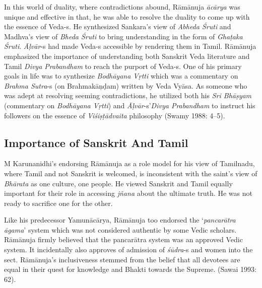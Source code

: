 In this world of duality, where contradictions abound, Rāmānuja \textit{ācārya} was unique and effective in that, he was able to resolve the duality to come up with the essence of Veda-s. He synthesized Sankara’s view of \textit{Abheda Śruti} and Madhva’s view of \textit{Bheda Śruti} to bring understanding in the form of \textit{Ghaṭaka Śruti}. \textit{Āḷvār}-s had made Veda-s accessible by rendering them in Tamil. Rāmānuja emphasized the importance of understanding both Sanskrit Veda literature and Tamil \textit{Divya Prabandham} to reach the purport of Veda-s. One of his primary goals in life was to synthesize \textit{Bodhāyana Vṛtti} which was a commentary on \textit{Brahma Sutra}-s (on Brahmakāņḍam) written by Veda Vyāsa. As someone who was adept at resolving seeming contradictions, he utilized both his \textit{Sri Bhāṣyam} (commentary on \textit{Bodhāyana Vṛtti}) and \textit{Āḷvār}-s’\textit{Divya Prabandham} to instruct his followers on the essence of \textit{Viśiṣṭādvaita} philosophy (Swamy 1988: 4–5).

\vskip -20pt


\subsection*{Importance of Sanskrit And Tamil}

\vskip -6pt

M Karunanidhi’s endorsing Rāmānuja as a role model for his view of Tamilnadu, where Tamil and not Sanskrit is welcomed, is inconsistent with the saint’s view of \textit{Bhārata} as one culture, one people. He viewed Sanskrit and Tamil equally important for their role in accessing \textit{jñana} about the ultimate truth. He was not ready to sacrifice one for the other.

Like his predecessor Yamunācārya, Rāmānuja too endorsed the ‘\textit{pancarātra āgama}’ system which was not considered authentic by some Vedic scholars. Rāmānuja firmly believed that the pancarātra system was an approved Vedic system. It incidentally also approves of admission of \textit{śūdra}-s and women into the sect. Rāmānuja’s inclusiveness stemmed from the belief that all devotees are equal in their quest for knowledge and Bhakti towards the Supreme. (Sawai 1993: 62).

